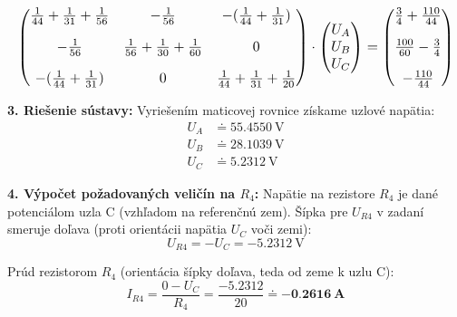 \documentclass[12pt,a4paper]{article}
\begin{document}
\begin{equation*}
    \resizebox{1\hsize}{!}{$
            \begin{pmatrix}
                \frac{1}{44} + \frac{1}{31} + \frac{1}{56} & -\frac{1}{56}                              & -(\frac{1}{44} + \frac{1}{31})             \\[1em]
                -\frac{1}{56}                              & \frac{1}{56} + \frac{1}{30} + \frac{1}{60} & 0                                          \\[1em]
                -(\frac{1}{44} + \frac{1}{31})             & 0                                          & \frac{1}{44} + \frac{1}{31} + \frac{1}{20}
            \end{pmatrix}
            \cdot
            \begin{pmatrix}
                U_A \\ U_B \\ U_C
            \end{pmatrix}
            =
            \begin{pmatrix}
                \frac{3}{4} + \frac{110}{44} \\[1em]
                \frac{100}{60} - \frac{3}{4} \\[1em]
                -\frac{110}{44}
            \end{pmatrix}
        $}
\end{equation*}

\textbf{3. Riešenie sústavy:}
Vyriešením maticovej rovnice získame uzlové napätia:
\begin{align*}
    U_A & \doteq \qty{55,4550}{\volt} \\
    U_B & \doteq \qty{28,1039}{\volt} \\
    U_C & \doteq \qty{5,2312}{\volt}
\end{align*}

\textbf{4. Výpočet požadovaných veličín na $R_4$:}
Napätie na rezistore $R_4$ je dané potenciálom uzla C (vzhľadom na referenčnú zem).
Šípka pre $U_{R4}$ v zadaní smeruje doľava (proti orientácii napätia $U_C$ voči zemi):
\begin{equation*}
    U_{R4} = -U_C = -\qty{5,2312}{\volt}
\end{equation*}

Prúd rezistorom $R_4$ (orientácia šípky doľava, teda od zeme k uzlu C):
\begin{equation*}
    I_{R4} = \frac{0 - U_C}{R_4} = \frac{-\num{5,2312}}{20} \doteq \mathbf{-\qty{0,2616}{\ampere}}
\end{equation*}
\end{document}
